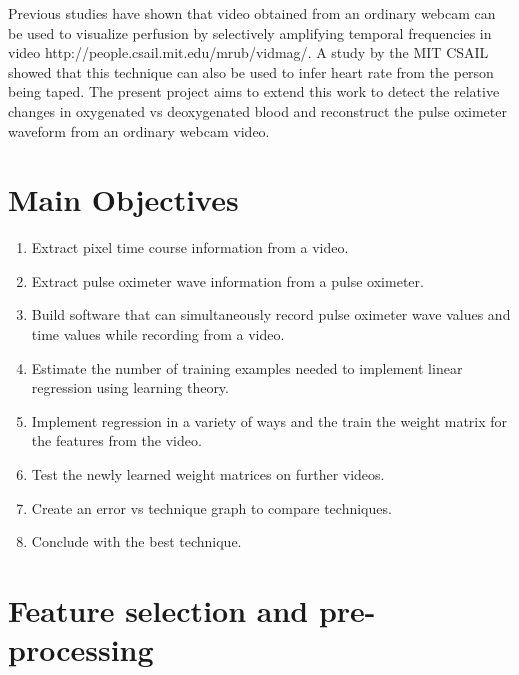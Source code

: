 \documentclass[a0,landscape]{a0poster}
\begin{document}
\begin{multicols}{4}
Previous studies have shown that video obtained from an ordinary webcam can be used to visualize perfusion by selectively amplifying temporal frequencies in video {http://people.csail.mit.edu/mrub/vidmag/}. A study by the MIT CSAIL showed that this technique can also be used to infer heart rate from the person being taped. The present project aims to extend this work to detect the relative changes in oxygenated vs deoxygenated blood and reconstruct the pulse oximeter waveform from an ordinary webcam video.

\color{DarkSlateGray} %

\section*{Main Objectives}

\begin{enumerate}
\item Extract pixel time course information from a video.
\item Extract pulse oximeter wave information from a pulse oximeter.
\item Build software that can simultaneously record pulse oximeter wave values and time values while recording from a video.
\item Estimate the number of training examples needed to implement linear regression using learning theory.
\item Implement regression in a variety of ways and the train the weight matrix for the features from the video.
\item Test the newly learned weight matrices on further videos.
\item Create an error vs technique graph to compare techniques.
\item Conclude with the best technique.
\end{enumerate}

\vspace{10cm} %

\section*{Feature selection and pre-processing}


\end{multicols}
\end{document}

